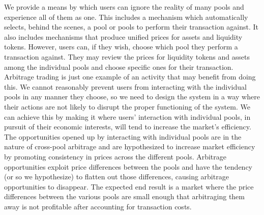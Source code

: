 \documentclass[12pt]{article}
\begin{document}
We provide a means by which users can ignore the reality of many pools
and experience all of them as one. This includes a mechanism which
automatically selects, behind the scenes, a pool or pools to perform their
transaction against. It also includes mechanisms that produce unified prices
for assets and liquidity tokens. However, users can, if they wish, choose which pool they perform a transaction against. They may review the prices for liquidity tokens and assets among the individual pools and choose specific ones for their transaction. Arbitrage
trading is just one example of an activity that may benefit from doing this. We
cannot reasonably prevent users from interacting with the individual pools in
any manner they choose, so we need to design the system in a way where
their actions are not likely to disrupt the proper functioning of the system. We can achieve this by making it where users' interaction with individual pools, in pursuit of their economic interests, will tend to increase the market's efficiency. The opportunities opened up by interacting with individual pools are in the nature of
cross-pool arbitrage and are hypothesized to increase market efficiency by promoting consistency in prices across the different pools. Arbitrage
opportunities exploit price differences between the pools and have the tendency
(or so we hypothesize) to flatten out those differences, causing arbitrage opportunities to disappear. The expected end result is a market where the price differences between the
various pools are small enough that arbitraging them away is not profitable after accounting for transaction costs.
\end{document}
